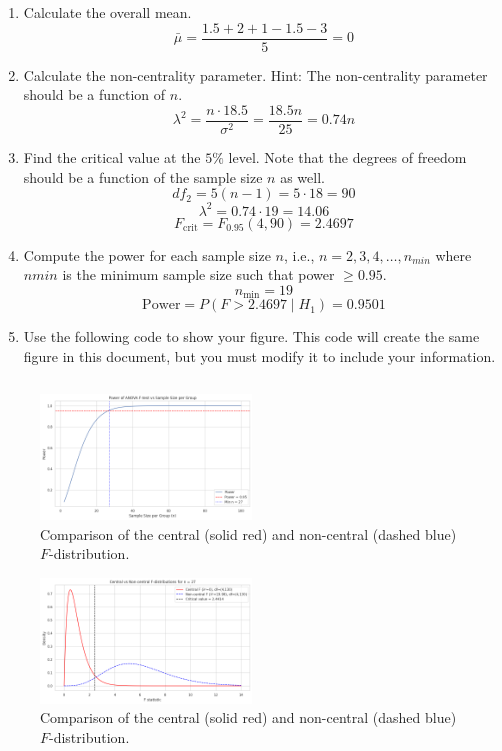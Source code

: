 \documentclass{article}
\begin{document}
\begin{enumerate}
	\item Calculate the overall mean.
	      \[
		      \bar{\mu} = \frac{1.5 + 2 + 1 - 1.5 - 3}{5} = 0
	      \]
	\item Calculate the non-centrality parameter. Hint: The non-centrality parameter
	      should be a function of $n$.
	      \[
		      \lambda^2 = \frac{n \cdot 18.5}{\sigma^2} = \frac{18.5n}{25} = 0.74n
	      \]
	\item Find the critical value at the $5\%$ level. Note that the degrees of freedom should be a function of the
	      sample size $n$ as well.
	      \[
		      df_2 = 5(n - 1) = 5 \cdot 18 = 90
	      \]
	      \[
		      \lambda^2 = 0.74 \cdot 19 = 14.06
	      \]
	      \[
		      F_{\text{crit}} = F_{0.95}(4, 90) = 2.4697
	      \]
	\item Compute the power for each sample size $n$, i.e., $n=2,3,4,\ldots,n_{min}$
	      where $n{min}$ is the minimum sample size such that power $\ge 0.95$.
	      \[
		      n_{\min} = 19
	      \]
	      \[
		      \text{Power} = P(F > 2.4697 \mid H_1) = 0.9501
	      \]
	\item Use the following code to show your figure. This code will create the same figure in this document, but you
	      must modify it to include your information.
\end{enumerate}

\begin{pythonbox}
	\inputminted{python}{code/prob6.py}
\end{pythonbox}
\begin{figure}[H]
	\centering
	\includegraphics[width=0.5\textwidth]{assets/prob6a.png}
	\caption{Comparison of the central (solid red) and non-central (dashed blue) $F$-distribution.}
\end{figure}
\begin{figure}[H]
	\centering
	\includegraphics[width=0.5\textwidth]{assets/prob6b.png}
	\caption{Comparison of the central (solid red) and non-central (dashed blue) $F$-distribution.}
\end{figure}
\end{document}
